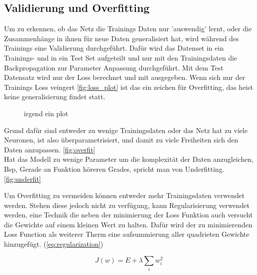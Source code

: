 \subsection{Validierung und Overfitting}


Um zu erkennen, ob das Netz die Trainings Daten nur 'auswendig' lernt, oder die 
Zusammenhänge in ihnen für neue Daten generalisiert hat, wird während des Trainings 
eine Validierung durchgeführt. Dafür wird das Datenset in ein Trainings- und in 
ein Test Set aufgeteilt und nur mit den Trainingsdaten die Backpropagation zur 
Parameter Anpassung durchgeführt. Mit dem Test Datensatz wird nur der Loss berechnet und
mit ausgegeben. Wenn sich nur der Trainings Loss veingert \ref{fig:loss_plot} ist das ein zeichen 
für Overfitting, das heist keine generalisierung findet statt. 


\begin{figure}[htb]
    \centering
    
    \caption{irgend ein plot}
    \label{fig:ptl}
\end{figure}

Grund dafür sind entweder zu wenige Trainingsdaten oder das Netz hat zu viele Neuronen, ist also 
überparametrisiert, und damit zu viele Freiheiten sich den Daten anzupassen. \ref{fig:overfit} 
\\
Hat das Modell zu wenige Parameter um die komplexität der Daten anzugleichen, Bsp, Gerade an Funktion 
höreren Grades, spricht man von Underfitting. \ref{fig:underfit}





Um Overfitting zu vermeiden können entweder mehr Trainingsdaten verwendet werden. Stehen diese 
jedoch nicht zu verfügung, kann Regularisierung verwendet werden, eine Technik die neben der 
minimierung der Loss Funktion auch versucht die Gewichte auf einem kleinen Wert zu halten. 
Dafür wird der zu minimierenden Loss Function als weiterer 
Therm eine aufsummierung aller quadrieten Gewichte hinzugefügt. (\ref{eq:regularization}) 
\cite{geronHandsonMachineLearning2017}


\begin{equation}
    \label{eq:regularization}
    J(w) = E + \lambda \sum_{i} w_{i}^{2}
\end{equation}

